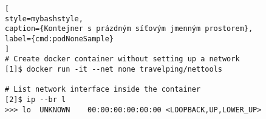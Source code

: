\begin{lstfloat}
\begin{lstlisting}[
style=mybashstyle,
caption={Kontejner s prázdným síťovým jmenným prostorem},
label={cmd:podNoneSample}
]
# Create docker container without setting up a network
[1]$ docker run -it --net none travelping/nettools

# List network interface inside the container 
[2]$ ip --br l
>>> lo  UNKNOWN    00:00:00:00:00:00 <LOOPBACK,UP,LOWER_UP>
\end{lstlisting}
\end{lstfloat}